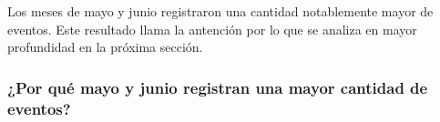 \documentclass[a4paper]{article}
\begin{document}
Los meses de mayo y junio registraron una cantidad notablemente mayor de eventos. Este resultado llama la antención por lo que se analiza en mayor profundidad en la próxima sección.

\subsubsection{¿Por qué mayo y junio registran una mayor cantidad de eventos?}

\newpage
\appendix


\newpage
\end{document}
